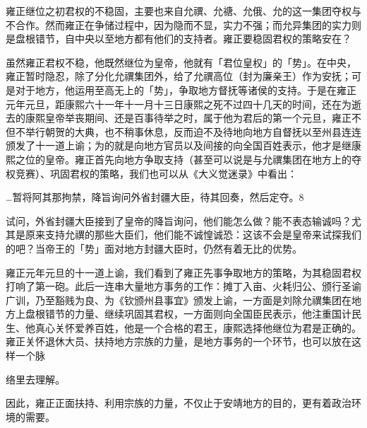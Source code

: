 雍正继位之初君权的不稳固，主要也来自允禩、允禟、允俄、允的这一集团夺权与不合作。然而雍正在争储过程中，因为隐而不显，实力不强；而允异集团的实力则是盘根错节，自中央以至地方都有他们的支持者。雍正要稳固君权的策略安在？

虽然雍正君权不稳，他既然继位为皇帝，他就有「君位皇权」的「势」。在中央，雍正暂时隐忍，除了分化允禩集团外，给了允禩高位（封为廉亲王）作为安抚；可是对于地方，他运用至高无上的「势」，争取地方督抚等诸侯的支持。于是在雍正元年元旦，距康熙六十一年十一月十三日康熙之死不过四十几天的时间，还在为逝去的康熙皇帝举丧期间、还是百事待举之时，属于他为君后的第一个元旦，雍正不但不举行朝贺的大典，也不稍事休息，反而迫不及待地向地方自督抚以至州县连连颁发了十一道上谕；为的就是向地方官员以及间接的向全国百姓表示，他才是继康熙之位的皇帝。雍正首先向地方争取支持（甚至可以说是与允禩集团在地方上的夺权竞赛）、巩固君权的策略，我们也可以从《大义觉迷录》中看出：

\begin{BookQuote}
…暂将阿其那拘禁，降旨询问外省封疆大臣，待其回奏，然后定夺。8
\end{BookQuote}

试问，外省封疆大臣接到了皇帝的降旨询问，他们能怎么做？能不表态输诚吗？尤其是原来支持允禩的那些大臣们，他们能不诚惶诚恐：这该不会是皇帝来试探我们的吧？当帝王的「势」面对地方封疆大臣时，仍然有着无比的优势。

雍正元年元旦的十一道上谕，我们看到了雍正先事争取地方的策略，为其稳固君权打响了第一砲。此后一连串大量地方事务的工作：摊丁入亩、火耗归公、颁行圣谕广训，乃至豁贱为良、为《钦颁州县事宜》颁发上谕，一方面是刘除允禩集团在地方上盘根错节的力量、继续巩固其君权，一方面则向全国臣民表示，他注重国计民生、他真心关怀爱养百姓，他是一个合格的君王，康熙选择他继位为君是正确的。雍正关怀退休大员、扶持地方宗族的力量，是地方事务的一个环节，也可以放在这样一个脉

\vfill
\begin{BookNotes}
\end{BookNotes}

\noindent 络里去理解。

因此，雍正正面扶持、利用宗族的力量，不仅止于安靖地方的目的，更有着政治环境的需要。

